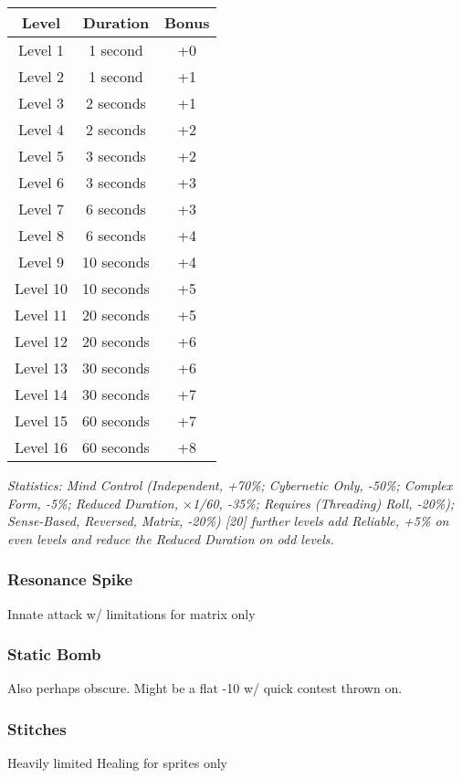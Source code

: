 \begin{multicols*}{3}
	\begin{center}
		\begin{tabular}{|c|c|c|}
			\hline
			Level & Duration & Bonus\\
			\hline
			\hline
			Level 1 & 1 second & +0 \\
			Level 2 & 1 second & +1 \\
			Level 3 & 2 seconds & +1 \\
			Level 4 & 2 seconds & +2 \\
			Level 5 & 3 seconds & +2 \\
			Level 6 & 3 seconds & +3 \\
			Level 7 & 6 seconds & +3 \\
			Level 8 & 6 seconds & +4 \\
			Level 9 & 10 seconds & +4 \\
			Level 10 & 10 seconds & +5 \\
			Level 11 & 20 seconds & +5 \\
			Level 12 & 20 seconds & +6 \\
			Level 13 & 30 seconds & +6 \\
			Level 14 & 30 seconds & +7 \\
			Level 15 & 60 seconds & +7 \\
			Level 16 & 60 seconds & +8 \\
			\hline
		\end{tabular}
	\end{center}

\textcolor{OliveGreen}{\textit{Statistics: Mind Control (Independent, +70\%; Cybernetic Only, -50\%; Complex Form, -5\%; Reduced Duration, \(\times\)1/60, -35\%; Requires (Threading) Roll, -20\%); Sense-Based, Reversed, Matrix, -20\%) [20] further levels add Reliable, +5\% on even levels and reduce the Reduced Duration on odd levels. }}
	
	\subsubsection*{Resonance Spike}
	
	Innate attack w/ limitations for matrix only
	
	\subsubsection*{Static Bomb}
	
	Also perhaps obscure. Might be a flat -10 w/ quick contest thrown on.
	
	\subsubsection*{Stitches}
	
	Heavily limited Healing for sprites only
	
\end{multicols*}